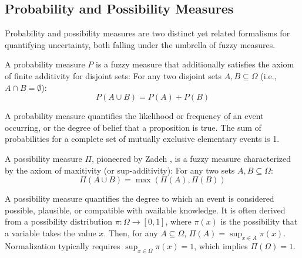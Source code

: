 \subsection{Probability and Possibility Measures}
Probability and possibility measures are two distinct yet related formalisms for quantifying uncertainty, both falling under the umbrella of fuzzy measures.

\begin{definition}
A probability measure $P$ is a fuzzy measure that additionally satisfies the axiom of finite additivity for disjoint sets:
For any two disjoint sets $A, B \subseteq \Omega$ (i.e., $A \cap B = \emptyset$):
\[ P(A \cup B) = P(A) + P(B) \]
\end{definition}
A probability measure quantifies the likelihood or frequency of an event occurring, or the degree of belief that a proposition is true. The sum of probabilities for a complete set of mutually exclusive elementary events is 1.

\begin{definition}
A possibility measure $\Pi$, pioneered by Zadeh \cite{Zadeh1978}, is a fuzzy measure characterized by the axiom of maxitivity (or sup-additivity):
For any two sets $A, B \subseteq \Omega$:
\[ \Pi(A \cup B) = \max(\Pi(A), \Pi(B)) \]
\end{definition}
A possibility measure quantifies the degree to which an event is considered possible, plausible, or compatible with available knowledge. It is often derived from a possibility distribution $\pi: \Omega \to [0, 1]$, where $\pi(x)$ is the possibility that a variable takes the value $x$. Then, for any $A \subseteq \Omega$, $\Pi(A) = \sup_{x \in A} \pi(x)$. Normalization typically requires $\sup_{x \in \Omega} \pi(x) = 1$, which implies $\Pi(\Omega) = 1$.




